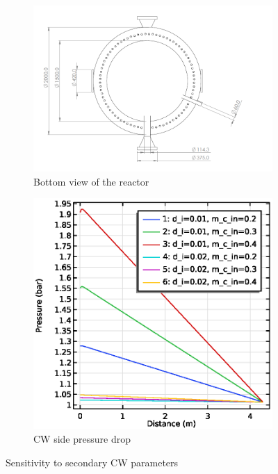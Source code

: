 \begin{figure}[H]
    \centering

    \begin{subfigure}{0.49\linewidth}
        \includegraphics[width=\linewidth]{chapters/2-reaction/figures/FYD reactor bottom view with calc.PNG}
        \caption{Bottom view of the reactor}
        \label{fig:comsol-S2:maxT}
    \end{subfigure}
    \begin{subfigure}{0.49\linewidth}
        \includegraphics[width=\linewidth]{figures/S2-CW-Pdrop.eps}
        \caption{CW side pressure drop}
        \label{fig:comsol-S2:CW-Pdrop}
    \end{subfigure}

    \caption{Sensitivity to secondary CW parameters}
    \label{fig:comsol-S2}
\end{figure}